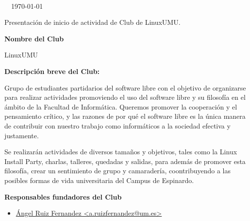\documentclass[11pt,a4paper]{letter} %
\def\opening#1{\thispagestyle{empty}
{\centering\fromaddress \vspace{0.6in} \\ %
\hspace*{1.5in}~\ \today \hspace*{\fill}\par} %
{\raggedright \toname  \toaddress \par} %
\vspace{0.1in} %
\noindent #1 %
}
\begin{document}

\begin{letter}

\opening{}

Presentación de inicio de actividad de Club de LinuxUMU.

\textbf{Nombre del Club}

LinuxUMU


\textbf{Descripción breve del Club:}

Grupo de estudiantes partidarios del software libre
con el objetivo de organizarse para realizar actividades promoviendo el uso del software libre
y su filosofía en el ámbito de la Facultad de Informática. Queremos promover la cooperación
y el pensamiento crítico, y las razones de por qué el software libre es la única manera
de contribuir con nuestro trabajo como informáticos a la sociedad efectiva y justamente.

Se realizarán actividades de diversos tamaños y objetivos, tales como la Linux Install Party,
charlas, talleres, quedadas y salidas, para además de promover esta filosofía,
crear un sentimiento de grupo y camaradería, coontribuyendo a las posibles formas
de vida universitaria del Campus de Espinardo.

\textbf{Responsables fundadores del Club}

\begin{itemize}
\item \href{mailto:Ángel Ruiz Fernandez <a.ruizfernandez@um.es>}{Ángel Ruiz Fernandez \textless a.ruizfernandez@um.es\textgreater}
\end{itemize}

\closing{}

\end{letter}
\end{document}
